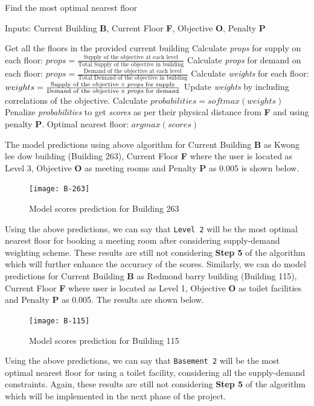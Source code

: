 {
\begin{algorithm}
  \caption{Find the most optimal nearest floor}
  Inputs: Current Building \textbf{B}, Current Floor \textbf{F}, Objective \textbf{O}, Penalty \textbf{P}
  \begin{algorithmic}[1]
    \STATE Get all the floors in the provided current building
    \STATE Calculate \textit{props} for supply on each floor: $props = \frac{\text{Supply of the objective at each level}}{\text{Total Supply of the objective in building}}$
    \STATE Calculate \textit{props} for demand on each floor: $props = \frac{\text{Demand of the objective at each level}}{\text{Total Demand of the objective in building}}$
    \STATE Calculate \textit{weights} for each floor: $weights = \frac{\text{Supply of the objective}\:\times\:\text{\textit{props} for supply}}{\text{Demand of the objective}\:\times\:\text{\textit{props} for demand}}$
    \STATE Update \textit{weights} by including correlations of the objective. 
    \STATE Calculate $probabilities = softmax(weights)$
    \STATE Penalize \textit{probabilities} to get \textit{scores} as per their physical distance from \textbf{F} and using penalty \textbf{P}.
    \STATE Optimal nearest floor: $argmax(scores)$
  \end{algorithmic}
\end{algorithm}
}
The model predictions using above algorithm for Current Building \textbf{B} as Kwong lee dow building (Building 263), Current Floor \textbf{F} where the user is located as Level 3, Objective \textbf{O} as meeting rooms and Penalty \textbf{P} as 0.005 is shown below.

\begin{figure}[H]
\centering
\texttt{[image: B-263]}
\caption{Model scores prediction for Building 263}
\label{fig:B-263}
\end{figure}

Using the above predictions, we can say that \texttt{Level 2} will be the most optimal nearest floor for booking a meeting room after considering supply-demand weighting scheme. These results are still not considering \textbf{Step 5} of the algorithm which will further enhance the accuracy of the scores. Similarly, we can do model predictions for Current Building \textbf{B} as Redmond barry building (Building 115), Current Floor \textbf{F} where user is located as Level 1, Objective \textbf{O} as toilet facilities and Penalty \textbf{P} as 0.005. The results are shown below.

\begin{figure}[H]
\centering
\texttt{[image: B-115]}
\caption{Model scores prediction for Building 115}
\label{fig:B-115}
\end{figure}

Using the above predictions, we can say that \texttt{Basement 2} will be the most optimal nearest floor for using a toilet facility, considering all the supply-demand constraints. Again, these results are still not considering \textbf{Step 5} of the algorithm which will be implemented in the next phase of the project. 

